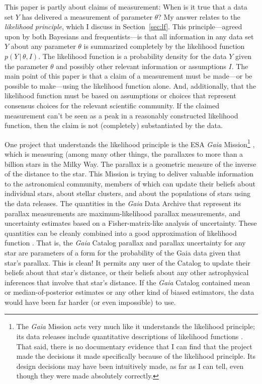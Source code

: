 \documentclass{article}
\newcommand{\sectionname}{Section}
\newcommand{\secref}[1]{\sectionname~\ref{#1}}
\newcommand{\given}{\,|\,}
\begin{document}
This paper is partly about claims of measurement:
When is it true that a data set $Y$ has delivered a measurement of parameter $\theta$?
My answer relates to the \emph{likelihood principle}, which I discuss in \secref{sec:lf}.
This principle---agreed upon by both Bayesians and frequentists---is that all information in any data set $Y$ about any parameter $\theta$ is summarized completely by the likelihood function $p(Y\given\theta, I)$.
The likelihood function is a probability density for the data $Y$ given the parameter $\theta$ and possibly other relevant information or assumptions $I$.
The main point of this paper is that a claim of a measurement must be made---or be possible to make---using the likelihood function alone.
And, additionally, that the likelihood function must be based on assumptions or choices that represent consensus choices for the relevant scientific community.
If the claimed measurement can't be seen as a peak in a reasonably constructed likelihood function, then the claim is not (completely) substantiated by the data.

One project that understands the likelihood principle is the ESA \textsl{Gaia} Mission\footnote{%
The \textsl{Gaia} Mission acts very much like it understands the likelihood principle; its data releases include quantitative descriptions of likelihood functions \cite{gaialf}.
That said, there is no documentary evidence that I can find that the project made the decisions it made specifically because of the likelihood principle.
Its design decisions may have been intuitively made, as far as I can tell, even though they were made absolutely correctly.}
\cite{gaia},
which is measuring (among many other things, the parallaxes to more than a billion stars in the Milky Way.
The parallax is a geometric measure of the inverse of the distance to the star.
This Mission is trying to deliver valuable information to the astronomical community, members of which can update their beliefs about individual stars, about stellar clusters, and about the populations of stars using the data releases.
The quantities in the \textsl{Gaia} Data Archive \cite{gaiadata} that represent its parallax measurements are maximum-likelihood parallax measurements, and uncertainty estimates based on a Fisher-matrix-like analysis of uncertainty.
These quantities can be cleanly combined into a good approximation of likelihood function \cite{gaialf}.
That is, the \textsl{Gaia} Catalog parallax and parallax uncertainty for any star are parameters of a form for the probability of the Gaia data given that star's parallax.
This is clean!
It permits any user of the Catalog to update their beliefs about that star's distance, or their beliefs about any other astrophysical inferences that involve that star's distance.
If the \textsl{Gaia} Catalog contained mean or median-of-posterior estimates or any other kind of biased estimators, the data would have been far harder (or even impossible) to use.
\end{document}

